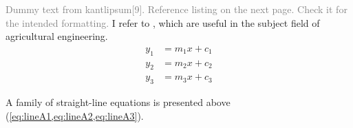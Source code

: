 \textcolor{gray}{Dummy text from kantlipsum[9]. Reference listing on the next page. Check it for the intended formatting.} I refer to \citep{lamport94,kopka2004guide,baczkowski1990ndsu}, which are useful in the subject field of agricultural engineering. 
\begin{align}
y_1 & = m_1x + c_1 
\label{eq:lineA1} \\
y_2 & = m_2x + c_2 
\label{eq:lineA2} \\
y_3 & = m_3x + c_3 
\label{eq:lineA3}
\end{align}

A family of straight-line equations is presented above (\cref{eq:lineA1,eq:lineA2,eq:lineA3}).


\kant[10]

\checkEndRefsection%

